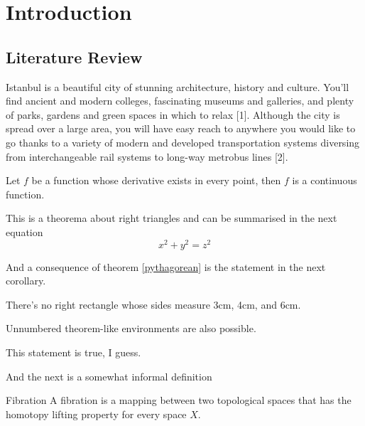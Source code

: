 \chapter{Introduction}

\section{Literature Review}
Istanbul is a beautiful city of stunning architecture, history and culture. You'll find ancient and modern colleges, fascinating museums and galleries, and plenty of parks, gardens and green spaces in which to relax [1]. Although the city is spread over a large area, you will have easy reach to anywhere you would like to go thanks to a variety of modern and developed transportation systems diversing from interchangeable rail systems to long-way metrobus lines [2].

\begin{theorem}
Let $f$ be a function whose derivative exists in every point, then $f$ is 
a continuous function.
\end{theorem}
 
\begin{theorem}
\label{pythagorean}
This is a theorema about right triangles and can be summarised in the next 
equation 
\begin{equation}
x^2 + y^2 = z^2
\end{equation}
\end{theorem}

And a consequence of theorem \ref{pythagorean} is the statement in the next 
corollary.
 
\begin{corollary}
There's no right rectangle whose sides measure 3cm, 4cm, and 6cm.
\end{corollary}
 

Unnumbered theorem-like environments are also possible.
 
\begin{remark}
This statement is true, I guess.
\end{remark}
 
And the next is a somewhat informal definition
 
\theoremstyle{definition}
\begin{definition}{Fibration}
A fibration is a mapping between two topological spaces that has the homotopy lifting property for every space $X$.
\end{definition}

